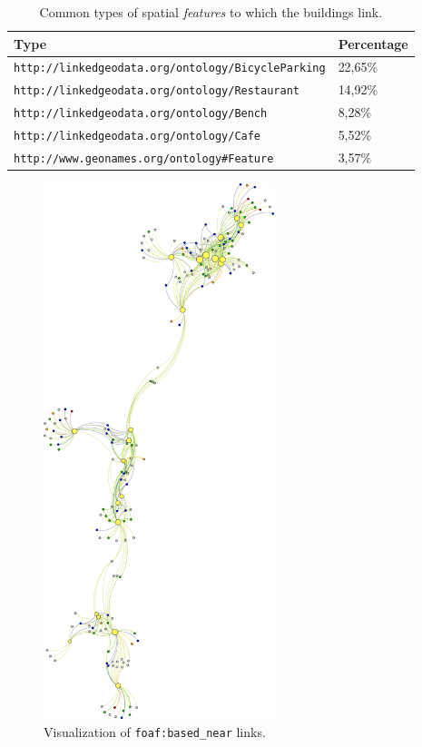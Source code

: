 \documentclass[draft,final]{vutinfth} %
\begin{document}
\begin{table}
  \centering
  \begin{tabular}{| l | l |}
    \hline
       Type & Percentage \\ \hline
       \texttt{http://linkedgeodata.org/ontology/BicycleParking} & 22,65\% \\ \hline
       \texttt{http://linkedgeodata.org/ontology/Restaurant} & 14,92\% \\ \hline
       \texttt{http://linkedgeodata.org/ontology/Bench} & 8,28\% \\ \hline
       \texttt{http://linkedgeodata.org/ontology/Cafe} & 5,52\% \\ \hline
       \texttt{http://www.geonames.org/ontology\#Feature} & 3,57\% \\ \hline
  \end{tabular}
  \caption{Common types of spatial \textit{features} to which the buildings link.}
  \label{tab:dicussion-chapter-evaluation:linking}
\end{table}

\begin{figure}[h]
    \centering
    \includegraphics[width=0.6\textwidth]{graphics/evaluation/buildingsNearByLinking.png}
    \caption{Visualization of \texttt{foaf:based\_near} links.}
    \label{fig:dicussion-chapter-evaluation:linking}
\end{figure}
\end{document}

